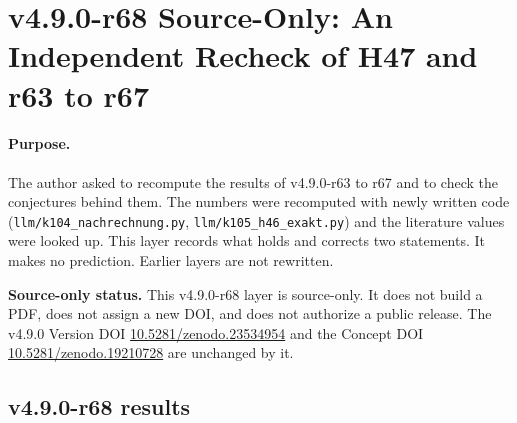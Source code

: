 \clearpage
\section*{v4.9.0-r68 Source-Only: An Independent Recheck of H47 and r63 to r67}
\label{sec:v490-r68-recheck}

\paragraph{Purpose.}
The author asked to recompute the results of v4.9.0-r63 to r67 and to check the conjectures behind them.  The numbers were recomputed with newly written code
(\texttt{llm/k104\_nachrechnung.py}, \texttt{llm/k105\_h46\_exakt.py}) and the literature values were looked up.  This layer records what holds and corrects two
statements.  It makes no prediction.  Earlier layers are not rewritten.

\noindent\textbf{Source-only status.}
This v4.9.0-r68 layer is source-only.  It does not build a PDF, does not assign a new DOI,
and does not authorize a public release.  The v4.9.0 Version DOI
\href{https://doi.org/10.5281/zenodo.23534954}{10.5281/zenodo.23534954} and the Concept DOI
\href{https://doi.org/10.5281/zenodo.19210728}{10.5281/zenodo.19210728} are unchanged by it.

\subsection*{v4.9.0-r68 results}
\label{subsec:v490-r68-results}


